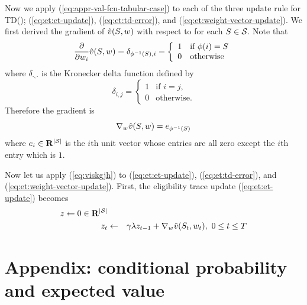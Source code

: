 Now we apply (\ref{eq:appr-val-fcn-tabular-case}) to each of the three update rule for TD(\tdparam);
(\ref{eq:et:et-update}),
(\ref{eq:et:td-error}),
and
(\ref{eq:et:weight-vector-update}).
We first derived the gradient of $\hat{v}(S_{}, {w_{}})$ with respect to \wvector{}
for each $S_{} \in \mathcal{S}$.
Note that
\begin{equation}
\frac{\partial}{\partial {w_{i}}} \hat{v}(S_{}, {w_{}})
= \delta_{\phi^{-1}(S_{}), i}
= \left\{\begin{array}{ll}
	1 & \mbox{if } \phi(i)= S_{}
	\\
	0 & \mbox{otherwise}
\end{array}\right.
\end{equation}
where $\delta_{\cdot, \cdot}$ is the Kronecker delta function
defined by
\begin{equation}
\delta_{i,j}
= \left\{\begin{array}{ll}
	1 & \mbox{if } i=j,
	\\
	0 & \mbox{otherwise.}
\end{array}\right.
\end{equation}
Therefore the gradient is
\begin{equation}
\label{eq:viskgjh}
\nabla_{{w_{}}} \hat{v}(S_{}, {w_{}}) = e_{\phi^{-1}(S_{})}
\end{equation}
where $e_i\in\mathbf{R}^{|\mathcal{S}|}$ is the $i$th unit vector 
whose entries are all zero except the $i$th entry which is $1$.


Now let us apply (\ref{eq:viskgjh}) to (\ref{eq:et:et-update}), (\ref{eq:et:td-error}),
and (\ref{eq:et:weight-vector-update}).
First, the eligibility trace update (\ref{eq:et:et-update}) becomes
\begin{eqnarray}
\nonumber
z_{} \leftarrow 0 \in \mathbf{R}^{|\mathcal{S}|}
\\
z_{t} &\leftarrow& \gamma \lambda z_{t-1} + \nabla_{{w_{}}} \hat{v}(S_{t}, {w_{t}}),
\ 0 \leq t \leq T
\end{eqnarray}












\section{Appendix: conditional probability and expected value}
\label{sec:rl-app}


